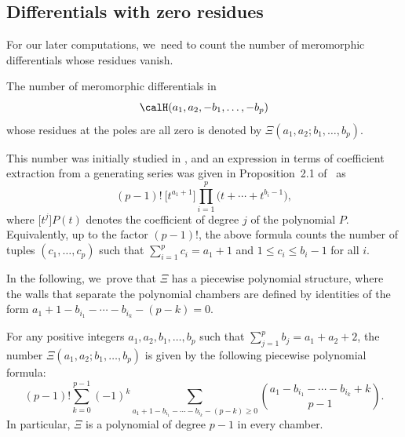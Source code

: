 \subsection{Differentials with zero residues}\label{sub:counting}

For our later computations, we~need to count the number of meromorphic differentials whose residues vanish.
\begin{defn}\label{def:residuless}
The number of meromorphic differentials in
\[
\calH(a_{1},a_{2},-b_{1},\dots,-b_{p})
\]
whose residues at the poles are all zero is denoted by $\Xi(a_{1},a_{2};b_{1},\dots,b_{p})$.
\end{defn}
This number was initially studied in \cite{EMZ}, and an expression in terms of coefficient extraction from a generating series was given in Proposition~2.1 of \cite{CMSZ}~as
\[
(p-1)!\ \big[t^{a_1+1}\big]\prod_{i=1}^p \big(t + \cdots + t^{b_i-1}\big),
\]
where $\big[t^{j}\big]P(t)$ denotes the coefficient of degree $j$ of the polynomial $P$.
Equivalently, up to the factor $(p-1)!$, the above formula
counts the number of tuples $(c_1, \ldots, c_p)$ such that
$\sum_{i=1}^p c_i = a_1 + 1$ and $1\leq c_i\leq b_i-1$ for all $i$.

In the following, we~prove that $\Xi$ has a piecewise polynomial structure, where the walls that separate the polynomial chambers are defined by identities of the form $a_1+1-b_{i_1}-\cdots -b_{i_k}-(p-k)= 0$.

\begin{prop}\label{prop:residueless}
For any positive integers $a_{1},a_{2},b_{1},\dots,b_{p}$ such that $\sum_{j=1}^p b_j = a_{1}+a_{2}+2$, the number $\Xi(a_{1},a_{2};b_{1},\dots,b_{p})$ is given by the following piecewise polynomial formula:
\begin{equation}
\label{eqn:residueless}
(p-1)!\sum_{k=0}^{p-1} (-1)^k \sum_{a_1+1-b_{i_1}-\cdots -b_{i_k}-(p-k)\geq 0} \binom{a_1-b_{i_1}-\cdots-b_{i_k}+k}{p-1}.
\end{equation}
In particular, $\Xi$ is a polynomial of degree $p-1$ in every chamber.
\end{prop}

